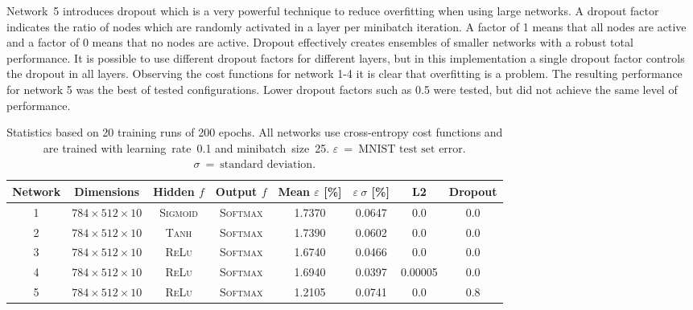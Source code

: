 Network~5 introduces dropout which is a very powerful technique to reduce overfitting when using large networks. A dropout factor indicates the ratio of nodes which are randomly activated in a layer per minibatch iteration. A factor of 1 means that all nodes are active and a factor of 0 means that no nodes are active. Dropout effectively creates ensembles of smaller networks with a robust total performance. It is possible to use different dropout factors for different layers, but in this implementation a single dropout factor controls the dropout in all layers. Observing the cost functions for network 1-4 it is clear that overfitting is a problem. The resulting performance for network 5 was the best of tested configurations. Lower dropout factors such as 0.5 were tested, but did not achieve the same level of performance.

\begin{table}
{\small
\begin{tabular}{cccccccc}
\toprule
Network & Dimensions                 & Hidden $f$       & Output $f$       & Mean $\varepsilon$ [\%] & $\varepsilon~\sigma$ [\%] & \textsc{L2}& Dropout \\
\midrule
1       & $784 \times 512 \times 10$ & \textsc{Sigmoid} & \textsc{Softmax} & 1.7370                  & 0.0647                    & 0.0        & 0.0     \\
2       & $784 \times 512 \times 10$ & \textsc{Tanh}    & \textsc{Softmax} & 1.7390                  & 0.0602                    & 0.0        & 0.0     \\
3       & $784 \times 512 \times 10$ & \textsc{ReLu}    & \textsc{Softmax} & 1.6740                  & 0.0466                    & 0.0        & 0.0     \\
4       & $784 \times 512 \times 10$ & \textsc{ReLu}    & \textsc{Softmax} & 1.6940                  & 0.0397                    & 0.00005    & 0.0     \\
5       & $784 \times 512 \times 10$ & \textsc{ReLu}    & \textsc{Softmax} & 1.2105                  & 0.0741                    & 0.0        & 0.8     \\
\bottomrule
\end{tabular}
}
\caption{Statistics based on 20 training runs of 200 epochs. All networks use cross-entropy cost functions and are trained with learning~rate~0.1 and minibatch~size~25. $\varepsilon~=~\text{MNIST test set error}$. $\sigma~=~\text{standard deviation}$.}
\label{table:results}
\end{table}

